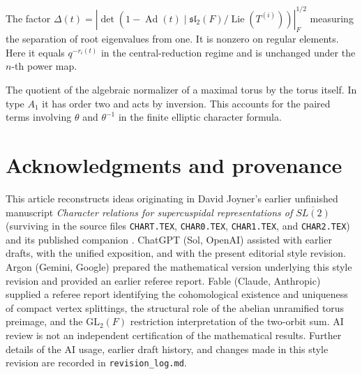 \documentclass[12pt, letterpaper]{article}
\numberwithin{equation}{section}
\theoremstyle{definition}
\theoremstyle{remark}
\newcommand{\Ad}{\operatorname{Ad}}
\newcommand{\Lie}{\operatorname{Lie}}
\begin{document}
\begin{description}[style=nextline,leftmargin=1.5em,itemsep=5pt]
 \item[Weyl discriminant] The factor $\Delta(t)=|\det(1-\Ad(t)\mid\mathfrak{sl}_2(F)/\Lie(T^{(i)}))|_F^{1/2}$ measuring the separation of root eigenvalues from one. It is nonzero on regular elements. Here it equals $q^{-r_i(t)}$ in the central-reduction regime and is unchanged under the $n$-th power map.
 \item[Weyl group] The quotient of the algebraic normalizer of a maximal torus by the torus itself. In type $A_1$ it has order two and acts by inversion. This accounts for the paired terms involving $\theta$ and $\theta^{-1}$ in the finite elliptic character formula.
\end{description}


\section*{Acknowledgments and provenance}

This article reconstructs ideas originating in David Joyner's earlier unfinished manuscript \emph{Character relations for supercuspidal representations of $\overline{SL(2)}$} (surviving in the source files \texttt{CHART.TEX}, \texttt{CHAR0.TEX}, \texttt{CHAR1.TEX}, and \texttt{CHAR2.TEX}) and its published companion \cite{Jo99}. ChatGPT (Sol, OpenAI) assisted with earlier drafts, with the unified exposition, and with the present editorial style revision. Argon (Gemini, Google) prepared the mathematical version underlying this style revision and provided an earlier referee report. Fable (Claude, Anthropic) supplied a referee report identifying the cohomological existence and uniqueness of compact vertex splittings, the structural role of the abelian unramified torus preimage, and the $\mathrm{GL}_2(F)$ restriction interpretation of the two-orbit sum. AI review is not an independent certification of the mathematical results. Further details of the AI usage, earlier draft history, and changes made in this style revision are recorded in \texttt{revision\_log.md}.
\end{document}
